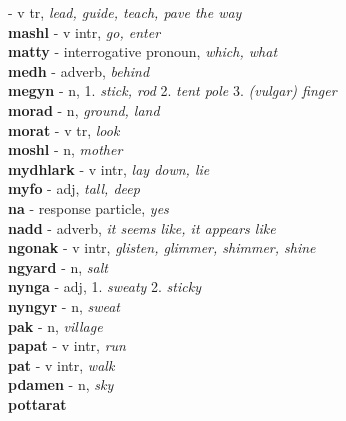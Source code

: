   - v tr, \emph{lead, guide, teach, pave the way}\\ \vspace{7pt}\textbf{mashl}   - v intr, \emph{go, enter}\\ \vspace{7pt}\textbf{matty}   - interrogative pronoun, \emph{which, what}\\ \vspace{7pt}\textbf{medh}   - adverb, \emph{behind}\\ \vspace{7pt}\textbf{megyn}   - n, 1. \emph{stick, rod} 2. \emph{tent pole} 3. \emph{(vulgar) finger} \\ \vspace{7pt}\textbf{morad}   - n, \emph{ground, land}\\ \vspace{7pt}\textbf{morat}   - v tr, \emph{look}\\ \vspace{7pt}\textbf{moshl}   - n, \emph{mother}\\ \vspace{7pt}\textbf{mydhlark}   - v intr, \emph{lay down, lie}\\ \vspace{7pt}\textbf{myfo}   - adj, \emph{tall, deep}\\ \vspace{7pt}\textbf{na}   - response particle, \emph{yes}\\ \vspace{7pt}\textbf{nadd}   - adverb, \emph{it seems like, it appears like}\\ \vspace{7pt}\textbf{ngonak}   - v intr, \emph{glisten, glimmer, shimmer, shine}\\ \vspace{7pt}\textbf{ngyard}   - n, \emph{salt}\\ \vspace{7pt}\textbf{nynga}   - adj, 1. \emph{sweaty} 2. \emph{sticky} \\ \vspace{7pt}\textbf{nyngyr}   - n, \emph{sweat}\\ \vspace{7pt}\textbf{pak}   - n, \emph{village}\\ \vspace{7pt}\textbf{papat}   - v intr, \emph{run}\\ \vspace{7pt}\textbf{pat}   - v intr, \emph{walk}\\ \vspace{7pt}\textbf{pdamen}   - n, \emph{sky}\\ \vspace{7pt}\textbf{pottarat}  